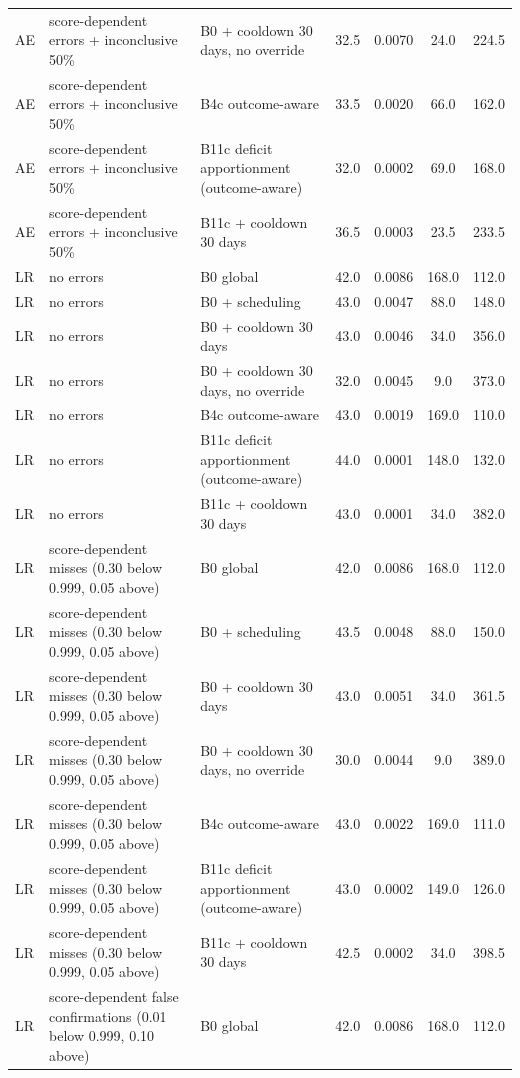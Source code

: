\documentclass[10pt,onecolumn,letterpaper]{article}
\begin{document}
\begin{longtable}{lp{5.2cm}p{4.4cm}cccc}
AE & score-dependent errors + inconclusive 50\% & B0 + cooldown 30 days, no override & 32.5 & 0.0070 & 24.0 & 224.5 \\
AE & score-dependent errors + inconclusive 50\% & B4c outcome-aware & 33.5 & 0.0020 & 66.0 & 162.0 \\
AE & score-dependent errors + inconclusive 50\% & B11c deficit apportionment (outcome-aware) & 32.0 & 0.0002 & 69.0 & 168.0 \\
AE & score-dependent errors + inconclusive 50\% & B11c + cooldown 30 days & 36.5 & 0.0003 & 23.5 & 233.5 \\
LR & no errors & B0 global & 42.0 & 0.0086 & 168.0 & 112.0 \\
LR & no errors & B0 + scheduling & 43.0 & 0.0047 & 88.0 & 148.0 \\
LR & no errors & B0 + cooldown 30 days & 43.0 & 0.0046 & 34.0 & 356.0 \\
LR & no errors & B0 + cooldown 30 days, no override & 32.0 & 0.0045 & 9.0 & 373.0 \\
LR & no errors & B4c outcome-aware & 43.0 & 0.0019 & 169.0 & 110.0 \\
LR & no errors & B11c deficit apportionment (outcome-aware) & 44.0 & 0.0001 & 148.0 & 132.0 \\
LR & no errors & B11c + cooldown 30 days & 43.0 & 0.0001 & 34.0 & 382.0 \\
LR & score-dependent misses (0.30 below 0.999, 0.05 above) & B0 global & 42.0 & 0.0086 & 168.0 & 112.0 \\
LR & score-dependent misses (0.30 below 0.999, 0.05 above) & B0 + scheduling & 43.5 & 0.0048 & 88.0 & 150.0 \\
LR & score-dependent misses (0.30 below 0.999, 0.05 above) & B0 + cooldown 30 days & 43.0 & 0.0051 & 34.0 & 361.5 \\
LR & score-dependent misses (0.30 below 0.999, 0.05 above) & B0 + cooldown 30 days, no override & 30.0 & 0.0044 & 9.0 & 389.0 \\
LR & score-dependent misses (0.30 below 0.999, 0.05 above) & B4c outcome-aware & 43.0 & 0.0022 & 169.0 & 111.0 \\
LR & score-dependent misses (0.30 below 0.999, 0.05 above) & B11c deficit apportionment (outcome-aware) & 43.0 & 0.0002 & 149.0 & 126.0 \\
LR & score-dependent misses (0.30 below 0.999, 0.05 above) & B11c + cooldown 30 days & 42.5 & 0.0002 & 34.0 & 398.5 \\
LR & score-dependent false confirmations (0.01 below 0.999, 0.10 above) & B0 global & 42.0 & 0.0086 & 168.0 & 112.0 \\

\end{longtable}
\end{document}
